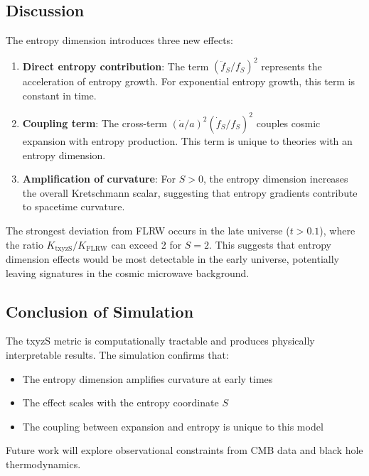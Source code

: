 \documentclass[11pt,a4paper]{article}
\begin{document}
\subsection{Discussion}

The entropy dimension introduces three new effects:

\begin{enumerate}
    \item \textbf{Direct entropy contribution}: The term $(\ddot{f}_S/f_S)^2$ 
          represents the acceleration of entropy growth. For exponential 
          entropy growth, this term is constant in time.

    \item \textbf{Coupling term}: The cross-term $(\dot{a}/a)^2(\dot{f}_S/f_S)^2$ 
          couples cosmic expansion with entropy production. This term is 
          unique to theories with an entropy dimension.

    \item \textbf{Amplification of curvature}: For $S > 0$, the entropy 
          dimension increases the overall Kretschmann scalar, suggesting 
          that entropy gradients contribute to spacetime curvature.
\end{enumerate}

The strongest deviation from FLRW occurs in the late universe ($t > 0.1$), 
where the ratio $K_{\text{txyzS}}/K_{\text{FLRW}}$ can exceed 2 for 
$S = 2$. This suggests that entropy dimension effects would be most 
detectable in the early universe, potentially leaving signatures in the 
cosmic microwave background.

\subsection{Conclusion of Simulation}

The txyzS metric is computationally tractable and produces 
physically interpretable results. The simulation confirms that:
\begin{itemize}
    \item The entropy dimension amplifies curvature at early times
    \item The effect scales with the entropy coordinate $S$
    \item The coupling between expansion and entropy is unique to this model
\end{itemize}
Future work will explore observational constraints from CMB data and 
black hole thermodynamics.
\end{document}
